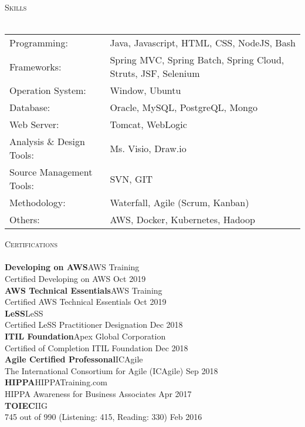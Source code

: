 \documentclass[a4paper]{article}
\newcommand{\lineunder} {
    \vspace*{-8pt} \\
    \hspace*{-18pt} \hrulefill \\
}
\newcommand{\header} [1] {
    {\hspace*{-18pt}\vspace*{6pt} \textsc{#1}}
    \vspace*{-6pt} \lineunder
}
\begin{document}
\header{Skills}
\begin{tabular}{ l l }
	Programming:                           & Java, Javascript, HTML, CSS, NodeJS, Bash                     \\
	Frameworks:                     & Spring MVC, Spring Batch, Spring Cloud, Struts, JSF, Selenium \\
	Operation System:               & Window, Ubuntu                                                \\
	Database:                       & Oracle, MySQL, PostgreQL, Mongo                               \\
	Web Server:                     & Tomcat, WebLogic                                              \\
	Analysis \& Design Tools:       & Ms. Visio, Draw.io                                            \\
	Source Management Tools: & SVN, GIT                                                      \\
	Methodology:                    & Waterfall, Agile (Scrum, Kanban)                              \\
	Others:                         & AWS, Docker, Kubernetes, Hadoop                                       \\
\end{tabular}
\vspace{2mm}

\header{Certifications}
\textbf{Developing on AWS}\hfill AWS Training\\
Certified Developing on AWS \hfill Oct 2019\\
\vspace{2mm}
\textbf{AWS Technical Essentials}\hfill AWS Training\\
Certified AWS Technical Essentials \hfill Oct 2019\\
\vspace{2mm}
\textbf{LeSS}\hfill LeSS\\
Certified LeSS Practitioner Designation \hfill Dec 2018\\
\vspace{2mm}
\textbf{ITIL Foundation}\hfill Apex Global Corporation\\
Certified of Completion ITIL Foundation \hfill Dec 2018\\
\vspace{2mm}
\textbf{Agile Certified Professonal}\hfill ICAgile\\
The International Consortium for Agile (ICAgile) \hfill Sep 2018\\
\vspace{2mm}
\textbf{HIPPA}\hfill HIPPATraining.com\\
HIPPA Awareness for Business Associates \hfill Apr 2017\\
\vspace{2mm}
\textbf{TOIEC}\hfill IIG\\
745 out of 990 (Listening: 415, Reading: 330) \hfill Feb 2016\\
\vspace{2mm}
\end{document}
